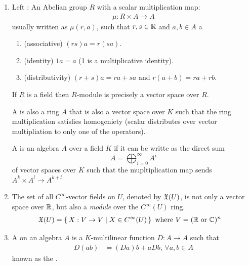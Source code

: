 \documentclass[10pt,a4paper]{report}
\begin{document}
\begin{enumerate}
	\textbf{Permuting Mult-linear Functions}.  Given any permutation $\sigma \in S_k$
	\begin{align*}
		f(v_1, \dots, v_k) &= f(v_{\sigma(1)}, \dots, v_{\sigma(k)})
	\end{align*}e.g., $f(x,y,z) = xyz \to f(z,x,y) = zxy$.  FYI: if $x,y,z$ are from non-commutative rings (i.e., matrices) then we must be aware of the $\SGN(\sigma)$.
	
	\item Left : An Abelian group $R$ with a scalar multiplication map:
	\begin{align*}
		\mu : R \times A \to A
	\end{align*}usually written as $\mu(r,a)$, such that $r,s \in \mathbb{R}$ and $a,b \in A$	 a
	\begin{enumerate}[label=(\roman*)]
		\item (associative) $(rs)a = r(sa)$.
		\item (identity) $1a = a$ (1 is a multiplicative identity).
		\item (distributivity) $(r+s)a = ra+sa$ and $r(a+b) = ra+rb$.	
	\end{enumerate}	 If $R$ is a field then $R$-module is precisely a vector space over $R$.
	
	A  is also a ring $A$ that is also a vector space over $K$ such that the ring multiplication satisfies homogeniety (scalar distributes over vector multipliation to only one of the operators).
	
	A  is an algebra $A$ over a field $K$ if it can be writte as the direct sum $$ A = \bigoplus_{i=0}^\infty A^i$$ of vector spaces over $K$ such that the mupltiplication map sends $A^k \times A^l \to A^{k+l}$
	
	\item The set of all $C^\infty$-vector fields on $U$, denoted by $\mathfrak{X}(U)$, is not only a vector space over $\mathbb{R}$, but also a \textit{module} over the $C^\infty(U)$ ring. \begin{align*}
		\mathfrak{X}(U) &= \left \{\,  X : V \to V \;|\; X \in C^\infty(U) \,\right \} \text{ where } V = (\mathbb{R} \text{ or } \mathbb{C})^n
	\end{align*}
	\item {} A  on an algebra $A$ is a $K$-multilinear function $D:A \to A$ such that 
	\begin{align*}
		D(ab) &= (Da)b+aDb, \, \forall a,b \in A
	\end{align*}known as the .
	

\end{enumerate}
\end{document}
